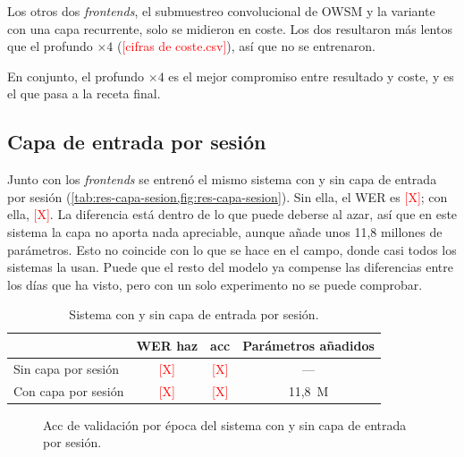 Los otros dos \textit{frontends}, el submuestreo convolucional de OWSM y la variante con una capa recurrente, solo se midieron en coste. Los dos resultaron más lentos que el profundo $\times 4$ (\textcolor{red}{[cifras de coste.csv]}), así que no se entrenaron.

En conjunto, el profundo $\times 4$ es el mejor compromiso entre resultado y coste, y es el que pasa a la receta final.

\subsection{Capa de entrada por sesión}
\label{sec:res-capa-sesion}

Junto con los \textit{frontends} se entrenó el mismo sistema con y sin capa de entrada por sesión (\cref{tab:res-capa-sesion,fig:res-capa-sesion}). Sin ella, el WER es \textcolor{red}{[X]}; con ella, \textcolor{red}{[X]}. La diferencia está dentro de lo que puede deberse al azar, así que en este sistema la capa no aporta nada apreciable, aunque añade unos 11,8 millones de parámetros. Esto no coincide con lo que se hace en el campo, donde casi todos los sistemas la usan. Puede que el resto del modelo ya compense las diferencias entre los días que ha visto, pero con un solo experimento no se puede comprobar.

\begin{table}[htbp]
  \centering
  \caption{Sistema con y sin capa de entrada por sesión.}
  \label{tab:res-capa-sesion}
  \small
  \begin{tabular}{lccc}
    \toprule
    & \textbf{WER haz} & \textbf{acc} & \textbf{Parámetros añadidos} \\
    \midrule
    Sin capa por sesión & \textcolor{red}{[X]} & \textcolor{red}{[X]} & --- \\
    Con capa por sesión & \textcolor{red}{[X]} & \textcolor{red}{[X]} & 11,8~M \\
    \bottomrule
  \end{tabular}
\end{table}

\begin{figure}[htbp]
  \centering
  \caption{Acc de validación por época del sistema con y sin capa de entrada por sesión.}
  \label{fig:res-capa-sesion}
\end{figure}

